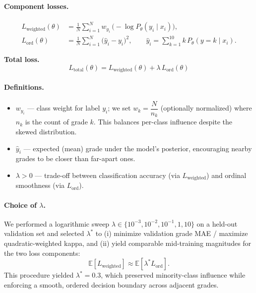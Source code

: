 \documentclass[12pt]{article}
\begin{document}
\paragraph{Component losses.}
\begin{align}
L_{\text{weighted}}(\theta) &= 
\frac{1}{N}\sum_{i=1}^{N} 
w_{y_i}\,\big(-\log P_\theta(y_i \mid x_i)\big), \\
L_{\text{ord}}(\theta) &= 
\frac{1}{N}\sum_{i=1}^{N} 
\big(\hat{y}_i - y_i\big)^2,
\qquad
\hat{y}_i = \sum_{k=1}^{10} k\,P_\theta(y=k\mid x_i).
\end{align}

\noindent\textbf{Total loss.}
\begin{equation}
L_{\text{total}}(\theta) = 
L_{\text{weighted}}(\theta)
+ \lambda\,L_{\text{ord}}(\theta)
\end{equation}

\paragraph{Definitions.}
\begin{itemize}
  \item $w_{y_i}$ --- class weight for label $y_i$; we set $w_k = \dfrac{N}{n_k}$ (optionally normalized) where $n_k$ is the count of grade $k$. This balances per-class influence despite the skewed distribution.
  \item $\hat{y}_i$ --- expected (mean) grade under the model’s posterior, encouraging nearby grades to be closer than far-apart ones.
  \item $\lambda > 0$ --- trade-off between classification accuracy (via $L_{\text{weighted}}$) and ordinal smoothness (via $L_{\text{ord}}$).
\end{itemize}

\paragraph{Choice of $\lambda$.}
We performed a logarithmic sweep $\lambda \in \{10^{-3},10^{-2},10^{-1},1,10\}$ on a held-out validation set and selected $\lambda^\ast$ to (i) minimize validation grade MAE / maximize quadratic-weighted kappa, and (ii) yield comparable mid-training magnitudes for the two loss components:
\[
\mathbb{E}\!\left[L_{\text{weighted}}\right]
\approx
\mathbb{E}\!\left[\lambda^\ast L_{\text{ord}}\right].
\]
This procedure yielded $\lambda^\ast = 0.3$, which preserved minority-class influence while enforcing a smooth, ordered decision boundary across adjacent grades.
\end{document}

